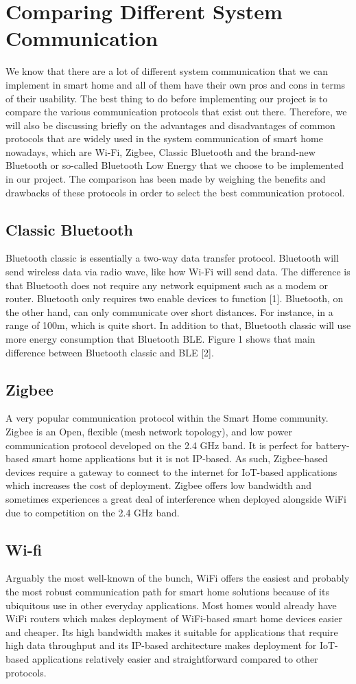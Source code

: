 \section{Comparing Different System Communication}
We know that there are a lot of different system communication that we can implement in smart home and all of them have their own pros and cons in terms of their usability. The best thing to do before implementing our project is to compare the various communication protocols that exist out there. Therefore, we will also be discussing briefly on the advantages and disadvantages of common protocols that are widely used in the system communication of smart home nowadays, which are Wi-Fi, Zigbee, Classic Bluetooth and the brand-new Bluetooth or so-called Bluetooth Low Energy that we choose to be implemented in our project. The comparison has been made by weighing the benefits and drawbacks of these protocols in order to select the best communication protocol. 
\subsection{Classic Bluetooth}
Bluetooth classic is essentially a two-way data transfer protocol. Bluetooth will send wireless data via radio wave, like how Wi-Fi will send data. The difference is that Bluetooth does not require any network equipment such as a modem or router. Bluetooth only requires two enable devices to function [1]. Bluetooth, on the other hand, can only communicate over short distances. For instance, in a range of 100m, which is quite short. In addition to that, Bluetooth classic will use more energy consumption that Bluetooth BLE. Figure 1 shows that main difference between Bluetooth classic and BLE [2].
\subsection{Zigbee}
A very popular communication protocol within the Smart Home community. Zigbee is an Open, flexible (mesh network topology), and low power communication protocol developed on the 2.4 GHz band. It is perfect for battery-based smart home applications but it is not IP-based. As such, Zigbee-based devices require a gateway to connect to the internet for IoT-based applications which increases the cost of deployment. Zigbee offers low bandwidth and sometimes experiences a great deal of interference when deployed alongside WiFi due to competition on the 2.4 GHz band.
\subsection{Wi-fi}
Arguably the most well-known of the bunch, WiFi offers the easiest and probably the most robust communication path for smart home solutions because of its ubiquitous use in other everyday applications. Most homes would already have WiFi routers which makes deployment of WiFi-based smart home devices easier and cheaper. Its high bandwidth makes it suitable for applications that require high data throughput and its IP-based architecture makes deployment for IoT-based applications relatively easier and straightforward compared to other protocols. 

